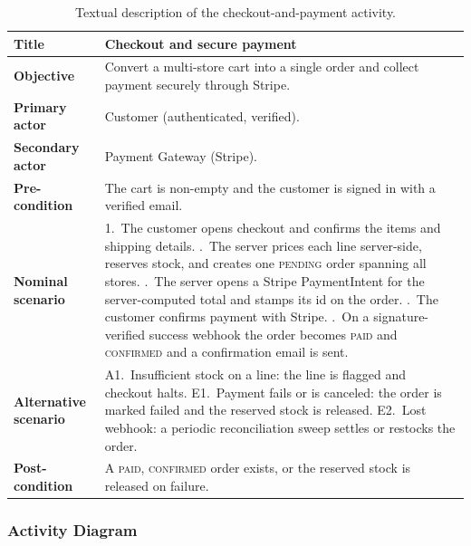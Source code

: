 \begin{table}[H]
  \centering
  \caption{Textual description of the checkout-and-payment activity.}
  \label{tab:act-checkout-desc}
  \renewcommand{\arraystretch}{1.3}
  \begin{tabularx}{\textwidth}{|>{\bfseries}p{3.2cm}|X|}
    \hline
    Title & Checkout and secure payment \\ \hline
    Objective & Convert a multi-store cart into a single order and collect payment securely through Stripe. \\ \hline
    Primary actor & Customer (authenticated, verified). \\ \hline
    Secondary actor & Payment Gateway (Stripe). \\ \hline
    Pre-condition & The cart is non-empty and the customer is signed in with a verified email. \\ \hline
    Nominal scenario & 1.~The customer opens checkout and confirms the items and shipping details. \newline 2.~The server prices each line server-side, reserves stock, and creates one \textsc{pending} order spanning all stores. \newline 3.~The server opens a Stripe PaymentIntent for the server-computed total and stamps its id on the order. \newline 4.~The customer confirms payment with Stripe. \newline 5.~On a signature-verified success webhook the order becomes \textsc{paid} and \textsc{confirmed} and a confirmation email is sent. \\ \hline
    Alternative scenario & A1.~Insufficient stock on a line: the line is flagged and checkout halts. \newline E1.~Payment fails or is canceled: the order is marked failed and the reserved stock is released. \newline E2.~Lost webhook: a periodic reconciliation sweep settles or restocks the order. \\ \hline
    Post-condition & A \textsc{paid}, \textsc{confirmed} order exists, or the reserved stock is released on failure. \\ \hline
  \end{tabularx}
\end{table}

\subsubsection{Activity Diagram}

